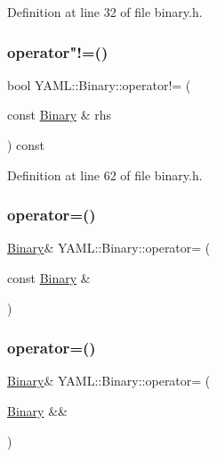 Definition at line 32 of file binary.\+h.

\mbox{\label{class_y_a_m_l_1_1_binary_af31e8ec0277113eace7f0508be989653}} 
\subsubsection{\texorpdfstring{operator"!=()}{operator!=()}}
{\footnotesize\ttfamily bool Y\+A\+M\+L\+::\+Binary\+::operator!= (\begin{DoxyParamCaption}\item[{const \mbox{\hyperlink{class_y_a_m_l_1_1_binary}{Binary}} \&}]{rhs }\end{DoxyParamCaption}) const\hspace{0.3cm}{\ttfamily [inline]}}



Definition at line 62 of file binary.\+h.

\mbox{\label{class_y_a_m_l_1_1_binary_ac764eab8c44eb6a7375689e28e4d511e}} 
\subsubsection{\texorpdfstring{operator=()}{operator=()}\hspace{0.1cm}{\footnotesize\ttfamily [1/2]}}
{\footnotesize\ttfamily \mbox{\hyperlink{class_y_a_m_l_1_1_binary}{Binary}}\& Y\+A\+M\+L\+::\+Binary\+::operator= (\begin{DoxyParamCaption}\item[{const \mbox{\hyperlink{class_y_a_m_l_1_1_binary}{Binary}} \&}]{ }\end{DoxyParamCaption})\hspace{0.3cm}{\ttfamily [default]}}

\mbox{\label{class_y_a_m_l_1_1_binary_a0d7e3acae65b202ce17d4aa5207070fe}} 
\subsubsection{\texorpdfstring{operator=()}{operator=()}\hspace{0.1cm}{\footnotesize\ttfamily [2/2]}}
{\footnotesize\ttfamily \mbox{\hyperlink{class_y_a_m_l_1_1_binary}{Binary}}\& Y\+A\+M\+L\+::\+Binary\+::operator= (\begin{DoxyParamCaption}\item[{\mbox{\hyperlink{class_y_a_m_l_1_1_binary}{Binary}} \&\&}]{ }\end{DoxyParamCaption})\hspace{0.3cm}{\ttfamily [default]}}

